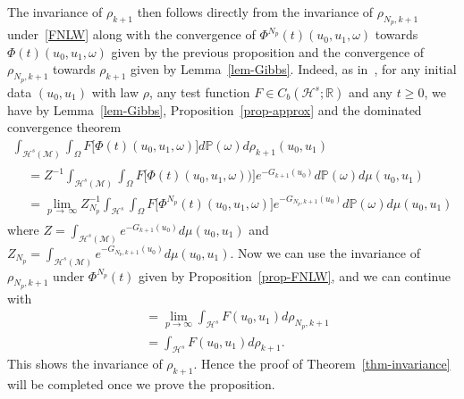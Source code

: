 \documentclass[AHL,Unicode,longabstracts,published]{cedram}
\newcommand{\R}{\mathbb{R}}
\newcommand{\Prob}{\mathbb{P}}
\newcommand{\M}{\mathcal{M}}
\renewcommand{\H}{\mathcal{H}}
\newcommand{\ZZ}{Z}
\renewcommand{\o}{\omega}
\renewcommand{\O}{\Omega}
\begin{document}
The invariance of $\rho_{k+1}$ then follows directly from the invariance of $\rho_{N_p,k+1}$ under~\eqref{FNLW} along with the convergence of $\Phi^{N_p}(t)(u_0,u_1,\o)$ towards $\Phi(t)(u_0,u_1,\o)$ given by the previous proposition and the convergence of $\rho_{N_p,k+1}$ towards $\rho_{k+1}$ given by Lemma~\ref{lem-Gibbs}. Indeed, as in~\cite{Tolomeo}, for any initial data $(u_0,u_1)$ with law $\rho$, any test function $F\in C_b(\H^s;\R)$ and any $t\ge 0$, we have by Lemma~\ref{lem-Gibbs}, Proposition~\ref{prop-approx} and the dominated convergence theorem
\begin{multline*}
\int_{\H^s(\M)}\int_\O F\big[\Phi(t)(u_0,u_1,\o)\big]d\Prob(\o)d\rho_{k+1}(u_0,u_1)\\
\begin{aligned}
&=\ZZ^{-1}\int_{\H^s(\M)}\int_\O F\big[\Phi(t)(u_0,u_1,\o))\big]e^{-G_{k+1}(u_0)}d\Prob(\o)d\mu(u_0,u_1)\\
&= \lim_{p\,\to\,\infty}\ZZ_{N_p}^{-1}\int_{\H^s}\int_\O F\big[\Phi^{N_p}(t)(u_0,u_1,\o)\big]e^{-G_{N_p,k+1}(u_0)}d\Prob(\o)d\mu(u_0,u_1)
\end{aligned}
\end{multline*}
where $\ZZ=\int_{\H^s(\M)}e^{-G_{k+1}(u_0)}d\mu(u_0,u_1)$ and $\ZZ_{N_p}=\int_{\H^s(\M)}e^{-G_{N_p,k+1}(u_0)}d\mu(u_0,u_1)$. Now we can use the invariance of $\rho_{N_p,k+1}$ under $\Phi^{N_p}(t)$ given by Proposition~\ref{prop-FNLW}, and we can continue with
\begin{align*}
 &=\lim_{p\to\infty}\int_{\H^s}F(u_0,u_1)d\rho_{N_p,k+1}\\
&=\int_{\H^s} F(u_0,u_1)d\rho_{k+1}.
\end{align*}
This shows the invariance of $\rho_{k+1}$. Hence the proof of Theorem~\ref{thm-invariance} will be completed once we prove the proposition.
\end{document}
